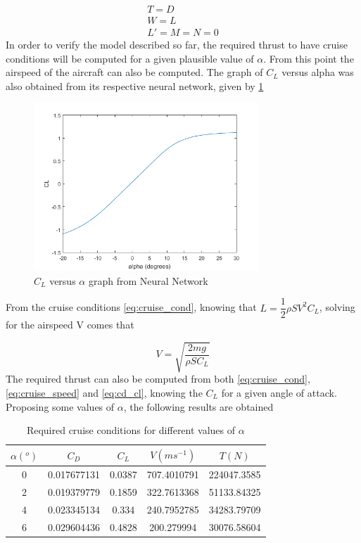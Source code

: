 \begin{gather}
	T=D\\
	W=L\\
	L'=M=N=0
\label{eq:cruise_cond}
\end{gather}
In order to verify the model described so far, the required thrust to have cruise conditions will be computed for a given plausible value of $\alpha$. From this point the airspeed of the aircraft can also be computed. The graph of $C_L$ versus alpha was also obtained from its respective neural network, given by \ref{fig:cl_alpha}
\begin{figure}[!htb]
  \centering
  \includegraphics[width=0.75\textwidth]{Figures/CL_alpha.png}
  \caption[$C_L$ versus $\alpha$ graph]{$C_L$ versus $\alpha$ graph from Neural Network}
  \label{fig:cl_alpha}
\end{figure}
From the cruise conditions \ref{eq:cruise_cond}, knowing that $L=\dfrac{1}{2}\rho S V^2 C_L$, solving for the airspeed V comes that

\begin{equation}
V=\sqrt{\dfrac{2mg}{\rho S C_L}}
\label{eq:cruise_speed}
\end{equation}
The required thrust can also be computed from both \ref{eq:cruise_cond}, \ref{eq:cruise_speed} and \ref{eq:cd_cl}, knowing the $C_L$ for a given angle of attack. Proposing some values of $\alpha$, the following results are obtained

\begin{table}[htbp]
  \centering
  \caption{Required cruise conditions for different values of $\alpha$}
    \begin{tabular}{ccccc}
    \toprule
    $\alpha (^o)$ & $C_D$ & $C_L$ & $V (ms^{-1})$ & $T (N)$ \\
    \midrule
    0     & 0.017677131 & 0.0387 & 707.4010791 & 224047.3585 \\
    2     & 0.019379779 & 0.1859 & 322.7613368 & 51133.84325 \\
    4     & 0.023345134 & 0.334 & 240.7952785 & 34283.79709 \\
    6     & 0.029604436 & 0.4828 & 200.279994 & 30076.58604 \\
    \bottomrule

    \end{tabular}%
  \label{tab:cruise_cond}%
\end{table}%

